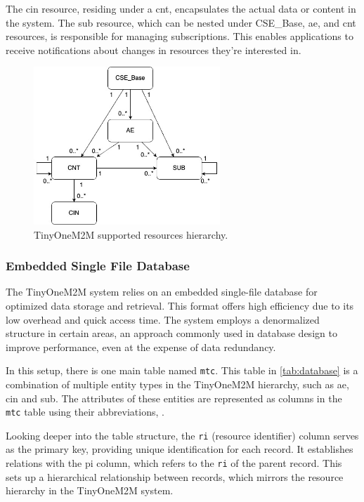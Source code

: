 \documentclass[a4paper,fleqn]{cas-dc}
\begin{document}
The \gls{cin} resource, residing under a \gls{cnt}, encapsulates the actual data or content in the system. The \gls{sub} resource, which can be nested under CSE\_Base, \gls{ae}, and \gls{cnt} resources, is responsible for managing subscriptions. This enables applications to receive notifications about changes in resources they're interested in.

\begin{figure}[htbp]
	\centering
	\includegraphics[width=7cm]{Hierarchy}
	\caption{TinyOneM2M supported resources hierarchy.}
	\label{fig:hierarchy}
\end{figure}

\subsubsection{Embedded Single File Database}

The TinyOneM2M system relies on an embedded single-file database for optimized data storage and retrieval. This format offers high efficiency due to its low overhead and quick access time. The system employs a denormalized structure in certain areas, an approach commonly used in database design to improve performance, even at the expense of data redundancy.

In this setup, there is one main table named \texttt{mtc}. This table in \ref{tab:database} is a combination of multiple entity types in the TinyOneM2M hierarchy, such as \gls{ae}, \gls{cin} and \gls{sub}. The attributes of these entities are represented as columns in the \texttt{mtc} table using their abbreviations, .

Looking deeper into the table structure, the \texttt{ri} (resource identifier) column serves as the primary key, providing unique identification for each record. It establishes relations with the \gls{pi} column, which refers to the \texttt{ri} of the parent record. This sets up a hierarchical relationship between records, which mirrors the resource hierarchy in the TinyOneM2M system.
\end{document}
